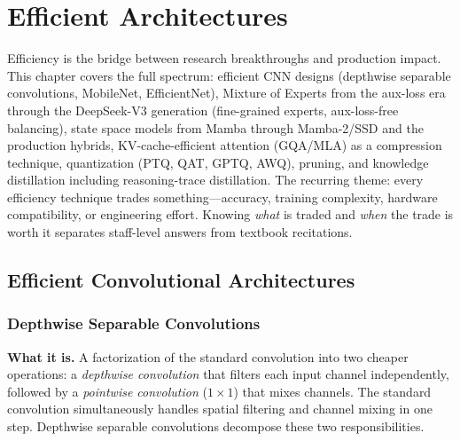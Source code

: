 \chapter{Efficient Architectures}
\label{chap:efficient_architectures}

\begin{tldr}
Efficiency is the bridge between research breakthroughs and production impact. This chapter covers the full spectrum: efficient CNN designs (depthwise separable convolutions, MobileNet, EfficientNet), Mixture of Experts from the aux-loss era through the DeepSeek-V3 generation (fine-grained experts, aux-loss-free balancing), state space models from Mamba through Mamba-2/SSD and the production hybrids, KV-cache-efficient attention (GQA/MLA) as a compression technique, quantization (PTQ, QAT, GPTQ, AWQ), pruning, and knowledge distillation including reasoning-trace distillation. The recurring theme: every efficiency technique trades something---accuracy, training complexity, hardware compatibility, or engineering effort. Knowing \textit{what} is traded and \textit{when} the trade is worth it separates staff-level answers from textbook recitations.
\end{tldr}

\section{Efficient Convolutional Architectures}
\label{sec:efficient_cnns}

\subsection{Depthwise Separable Convolutions}

\textbf{What it is.} A factorization of the standard convolution into two cheaper operations: a \textit{depthwise convolution} that filters each input channel independently, followed by a \textit{pointwise convolution} ($1 \times 1$) that mixes channels. The standard convolution simultaneously handles spatial filtering and channel mixing in one step. Depthwise separable convolutions decompose these two responsibilities.

